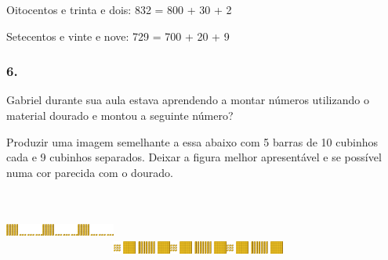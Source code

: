 Oitocentos e trinta e dois: 832 = 800 + 30 + 2

Setecentos e vinte e nove: 729 = 700 + 20 + 9

\subsubsection{6.}\label{section-5}

Gabriel durante sua aula estava aprendendo a montar números utilizando o
material dourado e montou a seguinte número?

Produzir uma imagem semelhante a essa abaixo com 5 barras de 10 cubinhos
cada e 9 cubinhos separados. Deixar a figura melhor apresentável e se
possível numa cor parecida com o dourado.

\includegraphics[width=0.47504in,height=1.02509in]{media/image3.png}\includegraphics[width=0.47504in,height=1.02509in]{media/image3.png}\includegraphics[width=0.47504in,height=1.02509in]{media/image3.png}\includegraphics[width=0.75006in,height=0.55838in]{media/image4.png}\includegraphics[width=0.75006in,height=0.55838in]{media/image4.png}\includegraphics[width=0.75006in,height=0.55838in]{media/image4.png}

